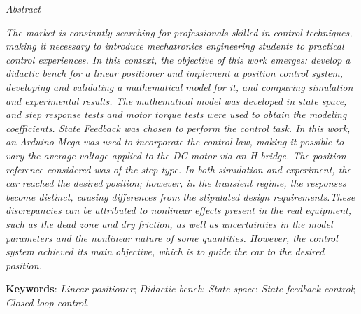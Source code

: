 \begin{center}
    \textit{\huge{Abstract} }
\end{center}
    
\noindent \textit{The market is constantly searching for professionals skilled in control techniques, making it necessary to introduce mechatronics engineering students to practical control experiences. In this context, the objective of this work emerges: develop a didactic bench for a linear positioner and implement a position control system, developing and validating a mathematical model for it, and comparing simulation and experimental results. The mathematical model was developed in state space, and step response tests and motor torque tests were used to obtain the modeling coefficients. State Feedback was chosen to perform the control task. In this work, an Arduino Mega was used to incorporate the control law, making it possible to vary the average voltage applied to the DC motor via an H-bridge. The position reference considered was of the step type. In both simulation and experiment, the car reached the desired position; however, in the transient regime, the responses become distinct, causing differences from the stipulated design requirements.These discrepancies can be attributed to nonlinear effects present in the real equipment, such as the dead zone and dry friction, as well as uncertainties in the model parameters and the nonlinear nature of some quantities. However, the control system achieved its main objective, which is to guide the car to the desired position.}

\vspace{\onelineskip}
    
\noindent
\textbf{Keywords}: \textit{Linear positioner}; \textit{Didactic bench}; \textit{State space}; \textit{State-feedback control}; \textit{Closed-loop control}.

\newpage